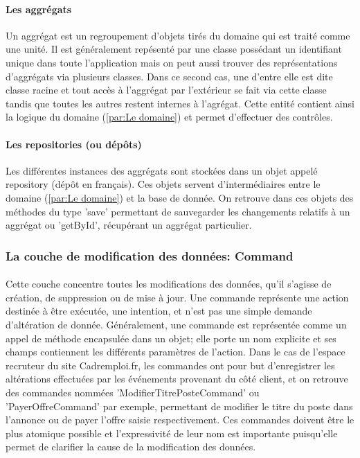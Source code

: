 \paragraph{Les aggrégats}
\label{par:Les aggrégats}
Un aggrégat est un regroupement d'objets tirés du domaine qui est traité comme une unité.
Il est généralement repésenté par une classe possédant un identifiant unique dans toute l'application mais on peut aussi trouver des représentations d'aggrégats via plusieurs classes.
Dans ce second cas, une d'entre elle est dite classe racine et tout accès à l'aggrégat par l'extérieur se fait via cette classe tandis que toutes les autres restent internes à l'agrégat.
Cette entité contient ainsi la logique du domaine (\ref{par:Le domaine}) et permet d'effectuer des contrôles.
\paragraph{Les repositories (ou dépôts)}
\label{par:Les repositories (ou dépôts)}
Les différentes instances des aggrégats sont stockées dans un objet appelé repository (dépôt en français).
Ces objets servent d'intermédiaires entre le domaine (\ref{par:Le domaine}) et la base de donnée.
On retrouve dans ces objets des méthodes du type 'save' permettant de sauvegarder les changements relatifs à un aggrégat ou 'getById', récupérant un aggrégat particulier.

\subsubsection{La couche de modification des données: Command}
\label{subs:La couche de modification des données: Command}
\paragraph{}
Cette couche concentre toutes les modifications des données, qu'il s'agisse de création, de suppression ou de mise à jour.
Une commande représente une action destinée à être exécutée, une intention, et n'est pas une simple demande d'altération de donnée.
Généralement, une commande est représentée comme un appel de méthode encapsulée dans un objet; elle porte un nom explicite et ses champs contiennent les différents paramètres de l'action.
Dans le cas de l'espace recruteur du site Cadremploi.fr, les commandes ont pour but d'enregistrer les altérations effectuées par les événements provenant du côté client, et on retrouve des commandes nommées 'ModifierTitrePosteCommand' ou 'PayerOffreCommand' par exemple, permettant de modifier le titre du poste dans l'annonce ou de payer l'offre saisie respectivement.
Ces commandes doivent être le plus atomique possible et l'expressivité de leur nom est importante puisqu'elle permet de clarifier la cause de la modification des données.
